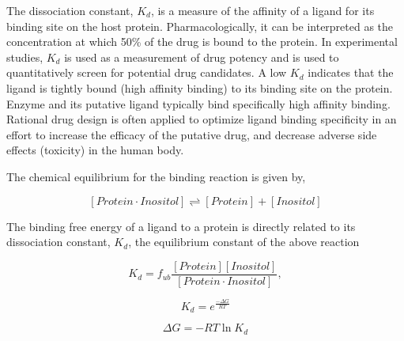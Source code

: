 The dissociation constant, $K_d$, is a measure of the affinity of a ligand for its binding site on the host protein. Pharmacologically, it can be interpreted as the concentration at which 50\% of the drug is bound to the protein. In experimental studies, $K_d$ is used as a measurement of drug potency and is used to quantitatively screen for potential drug candidates.  A low $K_d$ indicates that the ligand is tightly bound (high affinity binding) to its binding site on the protein.  Enzyme and its putative ligand typically bind specifically high affinity binding.  Rational drug design is often applied to optimize ligand binding specificity in an effort to increase the efficacy of the putative drug, and decrease adverse side effects (toxicity) in the human body.

The chemical equilibrium for the binding reaction is given by,

    \begin{equation}
      \left[ Protein\cdot Inositol \right] 
      \rightleftharpoons 
      \left[ Protein \right]+\left[ Inositol \right]
    \end{equation}
  
    
The binding free energy of a ligand to a protein is directly related to its dissociation constant, $K_d$, the equilibrium constant of the above reaction

    
     \begin{equation}
        K_{d} = f_{ub}\frac{\left[ Protein \right]\left[ Inositol \right]}{\left[Protein \cdot Inositol\right]},
     \end{equation}
     
     \begin{equation}
        K_{d} = e^{\frac{-\Delta G}{RT}}
     \end{equation}

     \begin{equation}
        \Delta G = -RT\ln K_d
     \end{equation}
     

